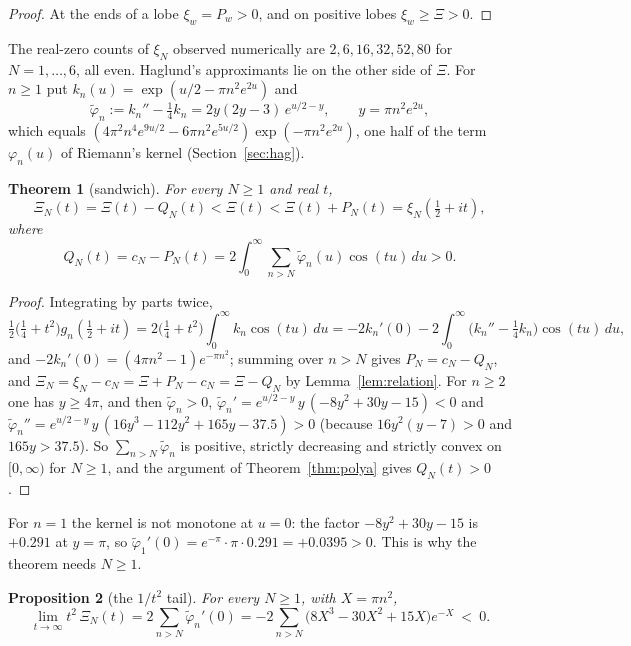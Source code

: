 \documentclass[11pt]{article}
\theoremstyle{plain}
\newtheorem{theorem}{Theorem}[section]
\newtheorem{proposition}[theorem]{Proposition}
\theoremstyle{definition}
\theoremstyle{remark}
\newcommand{\tphi}{\widetilde{\varphi}}
\begin{document}
\begin{proof}
At the ends of a lobe $\xi_w = P_w > 0$, and on positive lobes
$\xi_w \ge \Xi > 0$.
\end{proof}

The real-zero counts of $\xi_N$ observed numerically are $2, 6, 16, 32, 52, 80$
for $N = 1, \ldots, 6$, all even. Haglund's approximants lie on the other side of
$\Xi$. For $n \ge 1$ put $k_n(u) = \exp(u/2 - \pi n^2 e^{2u})$ and
\[
\tphi_n := k_n'' - \tfrac14 k_n = 2y(2y-3)\,e^{u/2 - y}, \qquad y = \pi n^2 e^{2u},
\]
which equals $(4\pi^2 n^4 e^{9u/2} - 6\pi n^2 e^{5u/2})\exp(-\pi n^2 e^{2u})$,
one half of the term $\varphi_n(u)$ of Riemann's kernel
(Section~\ref{sec:hag}).

\begin{theorem}[sandwich]\label{thm:sandwich}
For every $N \ge 1$ and real $t$,
\[
\Xi_N(t) = \Xi(t) - Q_N(t) < \Xi(t) < \Xi(t) + P_N(t) = \xi_N(\tfrac12 + it),
\]
where
\[
Q_N(t) = c_N - P_N(t) = 2\int_0^\infty \sum_{n > N}\tphi_n(u)\cos(tu)\,du > 0 .
\]
\end{theorem}

\begin{proof}
Integrating by parts twice,
\[
\tfrac12\bigl(\tfrac14 + t^2\bigr)g_n(\tfrac12+it)
= 2\bigl(\tfrac14 + t^2\bigr)\int_0^\infty k_n\cos(tu)\,du
= -2k_n'(0) - 2\int_0^\infty\bigl(k_n'' - \tfrac14 k_n\bigr)\cos(tu)\,du,
\]
and $-2k_n'(0) = (4\pi n^2 - 1)e^{-\pi n^2}$; summing over $n > N$ gives
$P_N = c_N - Q_N$, and $\Xi_N = \xi_N - c_N = \Xi + P_N - c_N = \Xi - Q_N$ by
Lemma~\ref{lem:relation}. For $n \ge 2$ one has $y \ge 4\pi$, and then
$\tphi_n > 0$,
$\tphi_n' = e^{u/2-y}\, y\,(-8y^2 + 30y - 15) < 0$ and
$\tphi_n'' = e^{u/2-y}\, y\,(16y^3 - 112y^2 + 165y - 37.5) > 0$ (because
$16y^2(y - 7) > 0$ and $165y > 37.5$). So $\sum_{n > N}\tphi_n$ is positive,
strictly decreasing and strictly convex on $[0, \infty)$ for $N \ge 1$, and the
argument of Theorem~\ref{thm:polya} gives $Q_N(t) > 0$.
\end{proof}

For $n = 1$ the kernel is not monotone at $u = 0$: the factor
$-8y^2 + 30y - 15$ is $+0.291$ at $y = \pi$, so
$\tphi_1'(0) = e^{-\pi}\cdot\pi\cdot 0.291 = +0.0395 > 0$. This is why the theorem
needs $N \ge 1$.

\begin{proposition}[the $1/t^2$ tail]\label{prop:tail}
For every $N \ge 1$, with $X = \pi n^2$,
\[
\lim_{t \to \infty} t^2\,\Xi_N(t)
= 2\sum_{n > N}\tphi_n'(0)
= -2\sum_{n > N}\bigl(8X^3 - 30X^2 + 15X\bigr)e^{-X} \ <\ 0 .
\]
\end{proposition}
\end{document}
